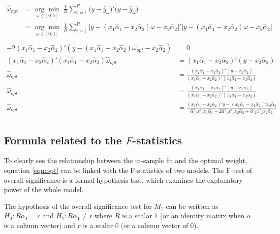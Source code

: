 \documentclass{monashthesis}
\begin{document}
\begin{align*}
\hat{\omega}_{\text{opt}} 
&= \underset{\omega \in [0,1]}{\arg\min} \ \frac{1}{R} \sum^R_{t=1} \big(y - \hat y_{\omega}\big)' \big(y - \hat y_{\omega}\big) \\
&= \underset{\omega \in [0,1]}{\arg\min} \ \frac{1}{R} \sum^R_{t=1} \big[y-(x_1 \hat\alpha_1 - x_2 \hat\alpha_2) \omega - x_2 \hat\alpha_2\big]'\big[y-(x_1 \hat\alpha_1 - x_2 \hat\alpha_2) \omega - x_2 \hat\alpha_2\big]\\
\end{align*}
\begin{align*}
    -2(x_1 \hat\alpha_1 - x_2 \hat\alpha_2)' (y-(x_1 \hat\alpha_1 - x_2 \hat\alpha_2) \hat\omega_{opt} - x_2 \hat\alpha_2) &= 0 \\
    (x_1 \hat\alpha_1 - x_2 \hat\alpha_2)' (x_1 \hat\alpha_1 - x_2 \hat\alpha_2) \hat\omega_{opt} &= (x_1 \hat\alpha_1 - x_2 \hat\alpha_2)' (y - x_2 \hat\alpha_2) \\
    \hat\omega_{opt} &= \frac{(x_1 \hat\alpha_1 - x_2 \hat\alpha_2)' (y - x_2 \hat\alpha_2)}{(x_1 \hat\alpha_1 - x_2 \hat\alpha_2)' (x_1 \hat\alpha_1 - x_2 \hat\alpha_2)} \\
    \hat\omega_{opt} &= \frac{(x_1 \hat\alpha_1 - x_2 \hat\alpha_2)' (y - x_2 \hat\alpha_2)}{(x_1 \hat\alpha_1 - x_2 \hat\alpha_2)' (x_1 \hat\alpha_1 - x_2 \hat\alpha_2)} \\
    \hat\omega_{opt} &= \frac{(x_1 \hat\alpha_1 - x_2 \hat\alpha_2)' y - (x_1 \hat\alpha_1 - x_2 \hat\alpha_2)' x_2 \hat\alpha_2}{\hat\alpha'_1 x'_1 x_1 \hat\alpha_1 - 2\hat\alpha'_1 x'_1 x_2 \hat\alpha_2 + \hat\alpha'_2 x'_2 x_2 \hat\alpha_2} \\
\end{align*}

\hypertarget{formula-related-to-the-f-statistics}{%
\subsection{\texorpdfstring{Formula related to the \(F\)-statistics}{Formula related to the F-statistics}}\label{formula-related-to-the-f-statistics}}

To clearly see the relationship between the in-sample fit and the optimal weight, equation \ref{eqn:opt} can be linked with the F-statistics of two models. The F-test of overall significance is a formal hypothesis test, which examines the explanatory power of the whole model.

The hypothesis of the overall significance test for \(M_1\) can be written as \(H_0: R\alpha_1 = r\) and \(H_1: R\alpha_1 \ne r\) where \(R\) is a scalar 1 (or an identity matrix when \(\alpha\) is a column vector) and \(r\) is a scalar 0 (or a column vector of 0).
\end{document}
